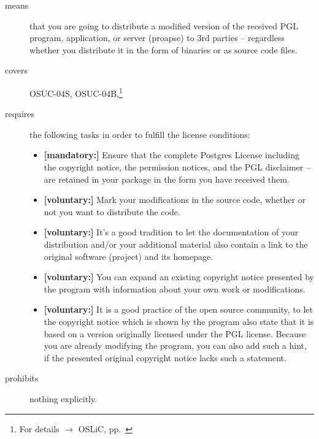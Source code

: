 \begin{description}

\item[means] that you are going to distribute a modified version of the received
PGL program, application, or server (proapse) to 3rd parties -- regardless
whether you distribute it in the form of binaries or as source code files.
\item[covers] OSUC-04S, OSUC-04B,\footnote{For details $\rightarrow$ OSLiC, pp.\
\pageref{OSUC-04S-DEF}} 

\item[requires] the following tasks in order to fulfill the license conditions:
\begin{itemize}
  \item \textbf{[mandatory:]} Ensure that the complete Postgres License
  including the copyright notice, the permission notices, and the PGL disclaimer
  -- are retained in your package in the form you have received them.
  \item \textbf{[voluntary:]} Mark your modifications in the source code,
  whether or not you want to distribute the code.
  \item \textbf{[voluntary:]} It's a good tradition to let the documentation of
  your distribution and/or your additional material also contain a link to the
  original software (project) and its homepage.
  \item \textbf{[voluntary:]} You can expand an existing copyright notice
  presented by the program with information about your own work or
  modifications.
  \item \textbf{[voluntary:]} It is a good practice of the open source
  community, to let the copyright notice which is shown by the program also
  state that it is based on a version originally licensed under the PGL license.
  Because you are already modifying the program, you can also add such a hint,
  if the presented original copyright notice lacks such a statement.
\end{itemize}

\item[prohibits] nothing explicitly.

\end{description}

